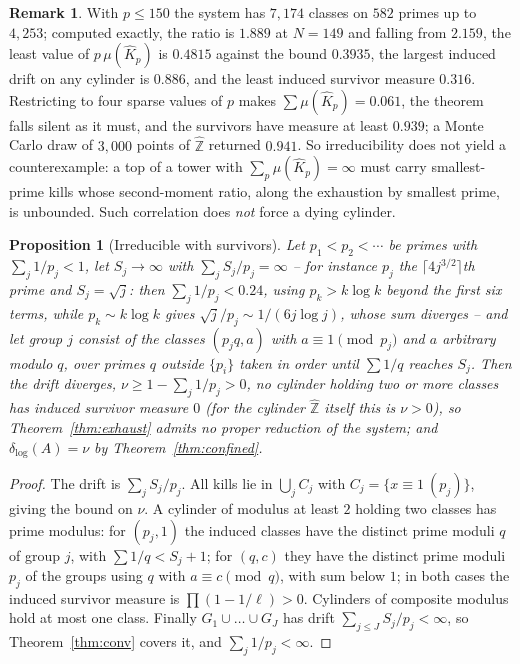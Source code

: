 \documentclass[11pt]{article}
\theoremstyle{plain}
\newtheorem{proposition}[theorem]{Proposition}
\theoremstyle{definition}
\newtheorem{remark}[theorem]{Remark}
\newcommand{\Zhat}{\widehat{\mathbb{Z}}}
\newcommand{\dlog}{\delta_{\log}}
\newcommand{\Kh}{\widehat{K}}
\begin{document}
\begin{remark}
With $p\le150$ the system has $7{,}174$ classes on $582$ primes
up to $4{,}253$; computed exactly, the ratio is $1.889$ at
$N=149$ and falling from $2.159$, the least value of
$p\,\mu(\Kh_p)$ is $0.4815$ against the bound $0.3935$, the
largest induced drift on any cylinder is $0.886$, and the least
induced survivor measure $0.316$.  Restricting to four sparse
values of $p$ makes $\sum\mu(\Kh_p)=0.061$, the theorem falls
silent as it must, and the survivors have measure at least
$0.939$; a Monte Carlo draw of $3{,}000$ points of $\Zhat$
returned $0.941$.  So irreducibility does not yield a
counterexample: a top of a tower with $\sum_p\mu(\Kh_p)=\infty$
must carry smallest-prime kills whose second-moment ratio, along
the exhaustion by smallest prime, is unbounded.  Such correlation does \emph{not} force a
dying cylinder.

\begin{proposition}[Irreducible with survivors]\label{prop:irred2}
Let $p_1<p_2<\cdots$ be primes with $\sum_j1/p_j<1$, let
$S_j\to\infty$ with $\sum_jS_j/p_j=\infty$ -- for instance $p_j$
the $\lceil4j^{3/2}\rceil$th prime and $S_j=\sqrt j$: then
$\sum_j1/p_j<0.24$, using $p_k>k\log k$ beyond the first six
terms, while $p_k\sim k\log k$ gives $\sqrt j/p_j\sim1/(6j\log j)$,
whose sum diverges -- and let
group $j$ consist of the classes $(p_jq,a)$ with
$a\equiv1\pmod{p_j}$ and $a$ arbitrary modulo $q$, over primes
$q$ outside $\{p_i\}$ taken in order until $\sum1/q$ reaches
$S_j$.  Then the drift diverges, $\nu\ge1-\sum_j1/p_j>0$, no
cylinder holding two or more classes has induced survivor
measure $0$ (for the cylinder $\Zhat$ itself this is $\nu>0$),
so Theorem~\ref{thm:exhaust} admits no proper
reduction of the system; and
$\dlog(A)=\nu$ by Theorem~\ref{thm:confined}.
\end{proposition}

\begin{proof}
The drift is $\sum_jS_j/p_j$.  All kills lie in $\bigcup_jC_j$
with $C_j=\{x\equiv1\ (p_j)\}$, giving the bound on $\nu$.  A
cylinder of modulus at least $2$ holding two classes has prime
modulus: for $(p_j,1)$
the induced classes have the distinct prime moduli $q$ of group
$j$, with $\sum1/q<S_j+1$; for $(q,c)$ they have the distinct
prime moduli $p_j$ of the groups using $q$ with $a\equiv c\pmod
q$, with sum below $1$; in both cases the induced survivor
measure is $\prod(1-1/\ell)>0$.  Cylinders of composite modulus
hold at most one class.  Finally $G_1\cup\dots\cup G_J$ has
drift $\sum_{j\le J}S_j/p_j<\infty$, so Theorem~\ref{thm:conv}
covers it, and $\sum_j1/p_j<\infty$.
\end{proof}


\end{remark}
\end{document}
